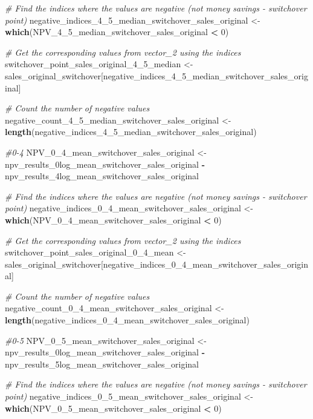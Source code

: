 \documentclass[
]{article}
\newenvironment{Shaded}{\begin{snugshade}}{\end{snugshade}}
\newcommand{\CommentTok}[1]{\textcolor[rgb]{0.56,0.35,0.01}{\textit{#1}}}
\newcommand{\DecValTok}[1]{\textcolor[rgb]{0.00,0.00,0.81}{#1}}
\newcommand{\FunctionTok}[1]{\textcolor[rgb]{0.13,0.29,0.53}{\textbf{#1}}}
\newcommand{\NormalTok}[1]{#1}
\newcommand{\OtherTok}[1]{\textcolor[rgb]{0.56,0.35,0.01}{#1}}
\newcommand{\SpecialCharTok}[1]{\textcolor[rgb]{0.81,0.36,0.00}{\textbf{#1}}}
\begin{document}
\begin{Shaded}
\begin{Highlighting}[]
\CommentTok{\# Find the indices where the values are negative (not money savings {-} switchover point)}
\NormalTok{negative\_indices\_4\_5\_median\_switchover\_sales\_original }\OtherTok{\textless{}{-}} \FunctionTok{which}\NormalTok{(NPV\_4\_5\_median\_switchover\_sales\_original }\SpecialCharTok{\textless{}} \DecValTok{0}\NormalTok{)}

\CommentTok{\# Get the corresponding values from vector\_2 using the indices}
\NormalTok{switchover\_point\_sales\_original\_4\_5\_median }\OtherTok{\textless{}{-}}\NormalTok{ sales\_original\_switchover[negative\_indices\_4\_5\_median\_switchover\_sales\_original]}

\CommentTok{\# Count the number of negative values}
\NormalTok{negative\_count\_4\_5\_median\_switchover\_sales\_original }\OtherTok{\textless{}{-}} \FunctionTok{length}\NormalTok{(negative\_indices\_4\_5\_median\_switchover\_sales\_original)}



\CommentTok{\#0{-}4}
\NormalTok{NPV\_0\_4\_mean\_switchover\_sales\_original }\OtherTok{\textless{}{-}}\NormalTok{ npv\_results\_0log\_mean\_switchover\_sales\_original }\SpecialCharTok{{-}}\NormalTok{ npv\_results\_4log\_mean\_switchover\_sales\_original}

\CommentTok{\# Find the indices where the values are negative (not money savings {-} switchover point)}
\NormalTok{negative\_indices\_0\_4\_mean\_switchover\_sales\_original }\OtherTok{\textless{}{-}} \FunctionTok{which}\NormalTok{(NPV\_0\_4\_mean\_switchover\_sales\_original }\SpecialCharTok{\textless{}} \DecValTok{0}\NormalTok{)}

\CommentTok{\# Get the corresponding values from vector\_2 using the indices}
\NormalTok{switchover\_point\_sales\_original\_0\_4\_mean }\OtherTok{\textless{}{-}}\NormalTok{ sales\_original\_switchover[negative\_indices\_0\_4\_mean\_switchover\_sales\_original]}

\CommentTok{\# Count the number of negative values}
\NormalTok{negative\_count\_0\_4\_mean\_switchover\_sales\_original }\OtherTok{\textless{}{-}} \FunctionTok{length}\NormalTok{(negative\_indices\_0\_4\_mean\_switchover\_sales\_original)}


\CommentTok{\#0{-}5}
\NormalTok{NPV\_0\_5\_mean\_switchover\_sales\_original }\OtherTok{\textless{}{-}}\NormalTok{ npv\_results\_0log\_mean\_switchover\_sales\_original }\SpecialCharTok{{-}}\NormalTok{ npv\_results\_5log\_mean\_switchover\_sales\_original}

\CommentTok{\# Find the indices where the values are negative (not money savings {-} switchover point)}
\NormalTok{negative\_indices\_0\_5\_mean\_switchover\_sales\_original }\OtherTok{\textless{}{-}} \FunctionTok{which}\NormalTok{(NPV\_0\_5\_mean\_switchover\_sales\_original }\SpecialCharTok{\textless{}} \DecValTok{0}\NormalTok{)}


\end{Highlighting}
\end{Shaded}
\end{document}
